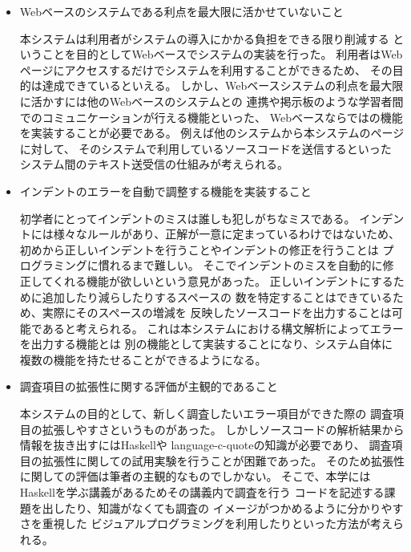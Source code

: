 \documentclass{csspaper}
\begin{document}
\begin{itemize}
         \item Webベースのシステムである利点を最大限に活かせていないこと
         
         本システムは利用者がシステムの導入にかかる負担をできる限り削減する
         ということを目的としてWebベースでシステムの実装を行った。
         利用者はWebページにアクセスするだけでシステムを利用することができるため、
         その目的は達成できているといえる。
         しかし、Webベースシステムの利点を最大限に活かすには他のWebベースのシステムとの
         連携や掲示板のような学習者間でのコミュニケーションが行える機能といった、
         Webベースならではの機能を実装することが必要である。
         例えば他のシステムから本システムのページに対して、
         そのシステムで利用しているソースコードを送信するといった
         システム間のテキスト送受信の仕組みが考えられる。

         \item インデントのエラーを自動で調整する機能を実装すること
         
         初学者にとってインデントのミスは誰しも犯しがちなミスである。
         インデントには様々なルールがあり、正解が一意に定まっているわけではないため、
         初めから正しいインデントを行うことやインデントの修正を行うことは
         プログラミングに慣れるまで難しい。
         そこでインデントのミスを自動的に修正してくれる機能が欲しいという意見があった。
         正しいインデントにするために追加したり減らしたりするスペースの
         数を特定することはできているため、実際にそのスペースの増減を
         反映したソースコードを出力することは可能であると考えられる。
         これは本システムにおける構文解析によってエラーを出力する機能とは
         別の機能として実装することになり、システム自体に
         複数の機能を持たせることができるようになる。

         \item 調査項目の拡張性に関する評価が主観的であること
         
         本システムの目的として、新しく調査したいエラー項目ができた際の
         調査項目の拡張しやすさというものがあった。
         しかしソースコードの解析結果から情報を抜き出すにはHaskellや
         language-c-quoteの知識が必要であり、
         調査項目の拡張性に関しての試用実験を行うことが困難であった。
         そのため拡張性に関しての評価は筆者の主観的なものでしかない。
         そこで、本学にはHaskellを学ぶ講義があるためその講義内で調査を行う
         コードを記述する課題を出したり、知識がなくても調査の
         イメージがつかめるように分かりやすさを重視した
         ビジュアルプログラミングを利用したりといった方法が考えられる。

      \end{itemize}
\end{document}
